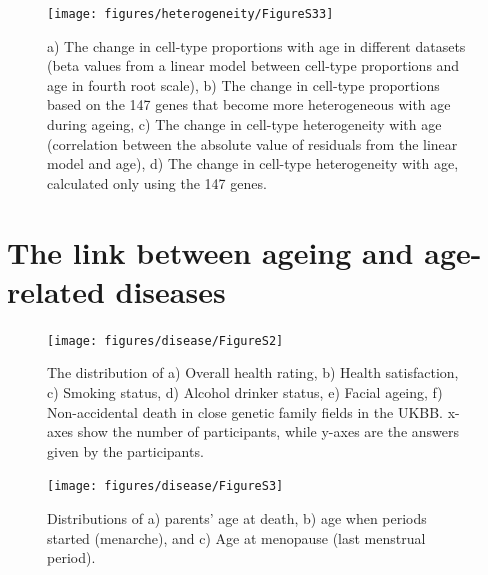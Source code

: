 \documentclass[12pt,twoside]{unicam}
\begin{document}
\begin{figure}

{\centering \texttt{[image: figures/heterogeneity/FigureS33]} 

}

\caption[Change in the cell type specific expression level and heterogeneity in datasets.]{a) The change in cell-type proportions with age in different datasets (beta values from a linear model between cell-type proportions and age in fourth root scale), b) The change in cell-type proportions based on the 147 genes that become more heterogeneous with age during ageing, c) The change in cell-type heterogeneity with age (correlation between the absolute value of residuals from the linear model and age), d) The change in cell-type heterogeneity with age, calculated only using the 147 genes.}\label{fig:hetFigS33}
\end{figure}
\newpage

\hypertarget{the-link-between-ageing-and-age-related-diseases-1}{%
\section{The link between ageing and age-related diseases}\label{the-link-between-ageing-and-age-related-diseases-1}}

\begin{figure}

{\centering \texttt{[image: figures/disease/FigureS2]} 

}

\caption[UK Biobank questionnaire responses.]{The distribution of a) Overall health rating, b) Health satisfaction, c) Smoking status, d) Alcohol drinker status, e) Facial ageing, f) Non-accidental death in close genetic family fields in the UKBB. x-axes show the number of participants, while y-axes are the answers given by the participants.}\label{fig:disFigS2}
\end{figure}

\begin{figure}

{\centering \texttt{[image: figures/disease/FigureS3]} 

}

\caption[Distributions of parents’ age at death, age at menarche, and age at menopause.]{Distributions of a) parents’ age at death, b) age when periods started (menarche), and c) Age at menopause (last menstrual period).}\label{fig:disFigS3}
\end{figure}
\end{document}
